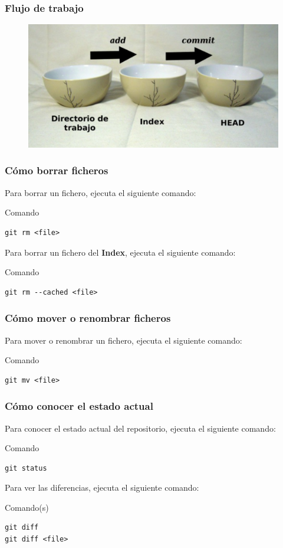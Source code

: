\documentclass{beamer}
\begin{document}
\begin{frame}
\frametitle{Flujo de trabajo}
\begin{figure}
\includegraphics[width=0.8\linewidth]{cuencos.png}
\end{figure}
\end{frame}

\begin{frame}[fragile]
\frametitle{Cómo borrar ficheros}
Para borrar un fichero, ejecuta el siguiente comando:
\begin{block}{Comando}
\begin{verbatim}
git rm <file>
\end{verbatim}
\end{block}
\vskip 1.00cm
Para borrar un fichero del \textbf{Index}, ejecuta el siguiente comando:
\begin{block}{Comando}
\begin{verbatim}
git rm --cached <file>
\end{verbatim}
\end{block}
\end{frame}

\begin{frame}[fragile]
\frametitle{Cómo mover o renombrar ficheros}
Para mover o renombrar un fichero, ejecuta el siguiente comando:
\begin{block}{Comando}
\begin{verbatim}
git mv <file>
\end{verbatim}
\end{block}
\end{frame}

\begin{frame}[fragile]
\frametitle{Cómo conocer el estado actual}
Para conocer el estado actual del repositorio, ejecuta el siguiente comando:
\begin{block}{Comando}
\begin{verbatim}
git status
\end{verbatim}
\end{block}
\vskip 1.00cm
Para ver las diferencias, ejecuta el siguiente comando:
\begin{block}{Comando(s)}
\begin{verbatim}
git diff
git diff <file>
\end{verbatim}
\end{block}
\end{frame}
\end{document}
